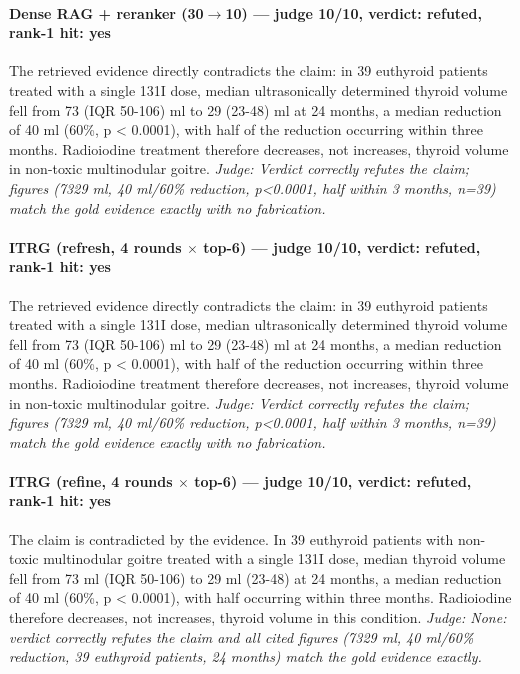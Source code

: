 \documentclass[sigconf, review, anonymous]{acmart}
\begin{document}
\paragraph{Dense RAG + reranker (30$\to$10) --- judge 10/10, verdict: refuted, rank-1 hit: yes}
\noindent The retrieved evidence directly contradicts the claim: in 39 euthyroid patients treated with a single 131I dose, median ultrasonically determined thyroid volume fell from 73 (IQR 50-106) ml to 29 (23-48) ml at 24 months, a median reduction of 40 ml (60\%, p < 0.0001), with half of the reduction occurring within three months. Radioiodine treatment therefore decreases, not increases, thyroid volume in non-toxic multinodular goitre.
\noindent\small\textit{Judge: Verdict correctly refutes the claim; figures (7329 ml, 40 ml/60\% reduction, p<0.0001, half within 3 months, n=39) match the gold evidence exactly with no fabrication.}
\paragraph{ITRG (refresh, 4 rounds $\times$ top-6) --- judge 10/10, verdict: refuted, rank-1 hit: yes}
\noindent The retrieved evidence directly contradicts the claim: in 39 euthyroid patients treated with a single 131I dose, median ultrasonically determined thyroid volume fell from 73 (IQR 50-106) ml to 29 (23-48) ml at 24 months, a median reduction of 40 ml (60\%, p < 0.0001), with half of the reduction occurring within three months. Radioiodine treatment therefore decreases, not increases, thyroid volume in non-toxic multinodular goitre.
\noindent\small\textit{Judge: Verdict correctly refutes the claim; figures (7329 ml, 40 ml/60\% reduction, p<0.0001, half within 3 months, n=39) match the gold evidence exactly with no fabrication.}
\paragraph{ITRG (refine, 4 rounds $\times$ top-6) --- judge 10/10, verdict: refuted, rank-1 hit: yes}
\noindent The claim is contradicted by the evidence. In 39 euthyroid patients with non-toxic multinodular goitre treated with a single 131I dose, median thyroid volume fell from 73 ml (IQR 50-106) to 29 ml (23-48) at 24 months, a median reduction of 40 ml (60\%, p < 0.0001), with half occurring within three months. Radioiodine therefore decreases, not increases, thyroid volume in this condition.
\noindent\small\textit{Judge: None: verdict correctly refutes the claim and all cited figures (7329 ml, 40 ml/60\% reduction, 39 euthyroid patients, 24 months) match the gold evidence exactly.}
\end{document}
